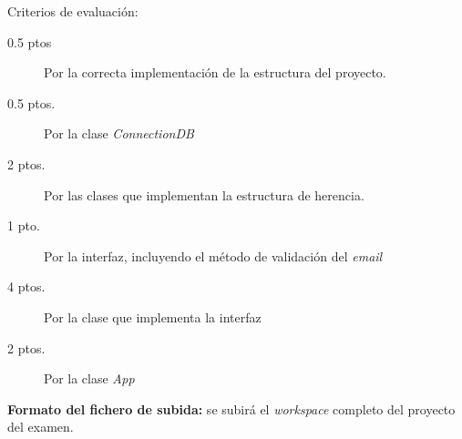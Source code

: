 \documentclass[addpoints,12pt]{exam}
\begin{document}
\begin{questions}
\newpage
Criterios de evaluación:
\begin{description}
\item[0.5 ptos] Por la correcta implementación de la estructura del proyecto.
\item[0.5 ptos.] Por la clase \emph{ConnectionDB}
\item[2 ptos.] Por las clases que implementan la estructura de herencia.
\item[1 pto.] Por la interfaz, incluyendo el método de validación del \emph{email}
\item[4 ptos.] Por la clase que implementa la interfaz
\item[2 ptos.] Por la clase \emph{App}
\end{description}
\textbf{Formato del fichero de subida:} se subirá el \emph{workspace} completo del proyecto del examen.
\end{questions}
\end{document}
